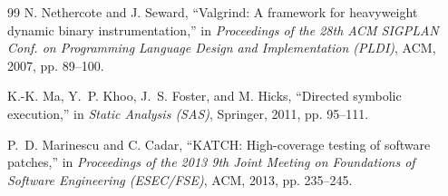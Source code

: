 \begin{thebibliography}{99}
N. Nethercote and J. Seward, ``Valgrind: A framework for heavyweight dynamic binary instrumentation,'' in \textit{Proceedings of the 28th ACM SIGPLAN Conf. on Programming Language Design and Implementation (PLDI)}, ACM, 2007, pp. 89--100.

K.-K. Ma, Y.~P. Khoo, J.~S. Foster, and M. Hicks, ``Directed symbolic execution,'' in \textit{Static Analysis (SAS)}, Springer, 2011, pp. 95--111.

P.~D. Marinescu and C. Cadar, ``KATCH: High-coverage testing of software patches,'' in \textit{Proceedings of the 2013 9th Joint Meeting on Foundations of Software Engineering (ESEC/FSE)}, ACM, 2013, pp. 235--245.





\end{thebibliography}

